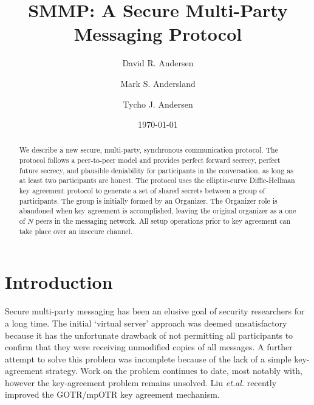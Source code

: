 \documentclass[%
preprint,
amsmath,amssymb,
aps,
prb,
floatfix,
]{revtex4-1}
\begin{document}

\title{SMMP: A Secure Multi-Party Messaging Protocol}%

\author{David R. Andersen}
\author{Mark S. Andersland}
\author{Tycho J. Andersen}

\date{\today}%

\begin{abstract}
We describe a new secure, multi-party, synchronous communication protocol.
The protocol follows a peer-to-peer model and provides perfect forward
secrecy, perfect future secrecy, and plausible deniability for participants in
the conversation, as long as at least two participants are honest.
The protocol uses the elliptic-curve Diffie-Hellman key agreement
protocol to generate a set of shared secrets between a group of
participants. The group is initially formed by an Organizer.
The Organizer role is abandoned when key agreement is accomplished, leaving
the original organizer as a one of $N$ peers in the messaging network.
All setup operations prior to key agreement can take place over an insecure
channel.
\end{abstract}

\maketitle

\section{\label{sec:Introduction}Introduction}
Secure multi-party messaging has been an elusive goal of security researchers
for a long time. The initial `virtual server' approach\cite{ref:bian}
was deemed unsatisfactory
because it has the unfortunate drawback of not permitting all participants to
confirm that they were receiving unmodified copies of all messages.
A further attempt to solve this problem\cite{ref:goldberg} was incomplete
because of the lack of a simple key-agreement strategy. Work on the problem
continues to date, most notably with\cite{ref:cryptocat}, however the
key-agreement problem remains unsolved. Liu \textit{et.al.}\cite{ref:liu}
recently improved the GOTR/mpOTR key agreement mechanism.
\end{document}
